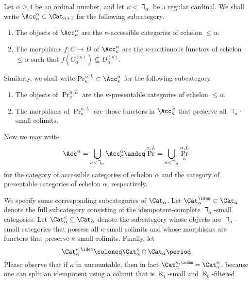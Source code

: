 \begin{notation}
	Let $ \alpha \geq 1 $ be an ordinal number, and
	let $ \kappa < \daleth_{\alpha} $ be a regular cardinal.
	We shall write $ \Acc_{\kappa}^{\alpha} \subset \Cat_{\alpha+1} $ for
	the following subcategory.
	\begin{enumerate}
		\item The objects of $ \Acc_{\kappa}^{\alpha} $ are
			the $ \kappa $-accessible categories of echelon $ \leq \alpha $.
		\item The morphisms $ f \colon C \to D $ of $ \Acc_{\kappa}^{\alpha} $ are
			the $ \kappa $-continuous functors of echelon $ \leq \alpha $
			such that $ f(C^{(\kappa)}_{\alpha}) \subseteq D^{(\kappa)}_{\alpha} $.
	\end{enumerate}
	Similarly, we shall write $ \Pr^{\alpha,L}_{\kappa} \subset \Acc_{\kappa}^{\alpha}$
	for the following subcategory.
	\begin{enumerate}
		\item The objects of $ \Pr^{\alpha,L}_{\kappa} $ are
			the $ \kappa $-presentable categories of echelon $ \leq \alpha $.
		\item The morphisms of $ \Pr^{\alpha,L}_{\kappa} $ are
			those functors in $ \Acc_{\kappa}^{\alpha} $
			that preserve all $ \daleth_{\alpha} $-small colimits.
	\end{enumerate}

	Now we may write
	\[
		\Acc^{\alpha} = \bigcup_{\kappa < \daleth_{\alpha}} \Acc_{\kappa}^{\alpha}
		\andeq 
		\Pr^{\alpha,L} = \bigcup_{\kappa < \daleth_{\alpha}} \Pr^{\alpha,L}_{\kappa}
	\]
	for the category of accessible categories of echelon $ \alpha $
	and the category of presentable categories of echelon $ \alpha $, respectively.

	We specify some corresponding subcategories of $ \Cat_{\alpha}$.
	Let $ \Cat_{\alpha}^{\idem} \subset \Cat_{\alpha} $ denote
	the full subcategory consisting of 
	the idempotent-complete $ \daleth_{\alpha} $-small categories.
	Let $ \Cat^{\kappa}_{\alpha} \subseteq \Cat_{\alpha} $ denote the subcategory
	whose objects are $ \daleth_{\alpha} $-small categories
	that possess all $ \kappa $-small colimits
	and whose morphisms are functors that preserve $ \kappa $-small colimits.
	Finally, let 
	\[ \Cat^{\kappa,\idem}_{\alpha} \coloneq \Cat^{\kappa}_{\alpha} \cap \Cat_{\alpha} \period \]
	Please observe that if $ \kappa $ in uncountable, then
	in fact $ \Cat^{\kappa,\idem}_{\alpha} = \Cat^{\kappa}_{\alpha} $,
	because one can split an idempotent using a colimit that is
	$ \aleph_1 $-small and $ \aleph_0 $-filtered
	\cite[Corollary 4.4.5.15 \& Example 5.3.1.9]{Lurie2009}
\end{notation}

